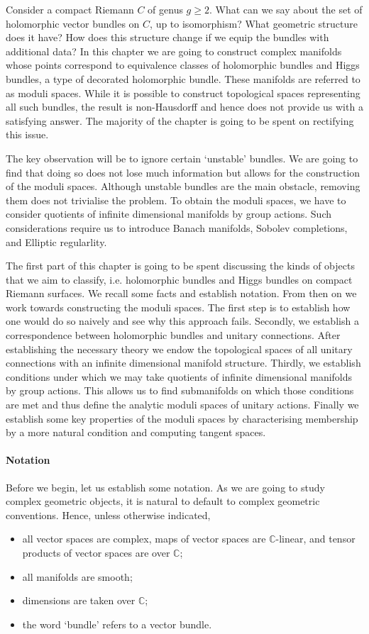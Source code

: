 \documentclass[12pt]{ociamthesis}  %
\begin{document}
Consider a compact Riemann $C$ of genus $g\geq 2$.
What can we say about the set of holomorphic vector bundles on $C$,
up to isomorphism? What geometric structure does it have? How does
this structure change if we equip the bundles with additional data?
In this chapter we are going to construct complex manifolds whose
points correspond to equivalence classes of holomorphic bundles
and Higgs bundles, a type of decorated holomorphic bundle. These
manifolds are referred to as moduli spaces. While it
is possible to construct topological spaces representing all such bundles,
the result is non-Hausdorff and hence does not provide us with a
satisfying answer. The majority of the chapter is going to be spent
on rectifying this issue.

The key observation will be to ignore certain `unstable' bundles. We
are going to find that doing so does not lose much information but
allows for the construction of the moduli spaces. Although unstable
bundles are the main obstacle, removing them does not trivialise the
problem. To obtain the moduli spaces, we have to consider quotients
of infinite dimensional manifolds by group actions. Such considerations
require us to introduce Banach manifolds, Sobolev completions, and
Elliptic regularlity.

The first part of this chapter is going to be spent discussing the kinds of
objects that we aim to classify, i.e. holomorphic bundles and Higgs
bundles on compact Riemann surfaces. We recall some facts and establish
notation. From then on we work towards constructing the moduli spaces.
The first step is to establish how one would do so naively and
see why this approach fails. Secondly, we establish a correspondence
between holomorphic bundles and unitary connections. After establishing the necessary
theory we endow the topological spaces of all unitary connections
with an infinite dimensional manifold structure. Thirdly, we establish
conditions under which we may take quotients of infinite dimensional
manifolds by group actions. This allows us to find submanifolds on which
those conditions are met and thus define the analytic moduli spaces of
unitary actions. Finally we establish some key properties of the
moduli spaces by characterising membership by a more natural
condition and computing tangent spaces.

\paragraph*{Notation}
Before we begin, let us establish some notation. As we are going to study
complex geometric objects, it is natural to default to complex
geometric conventions. Hence, unless otherwise indicated,
\begin{itemize}
  \item all vector spaces are complex, maps of vector spaces are
        $\mathbb{C}$-linear, and tensor products of vector spaces are
        over $\mathbb{C}$;
  \item all manifolds are smooth;
  \item dimensions are taken over $\mathbb{C}$;
  \item the word `bundle' refers to a vector bundle.
\end{itemize}
\end{document}
